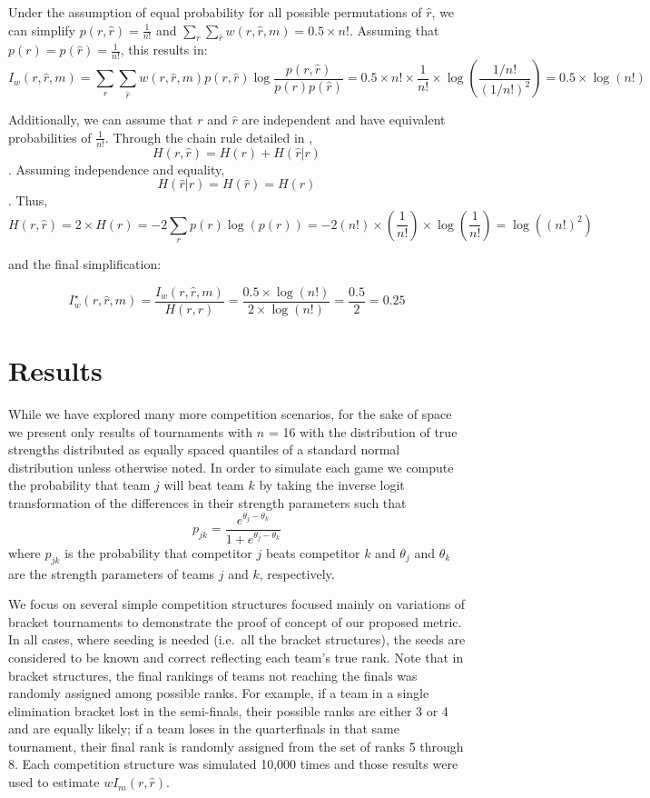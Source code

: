 \documentclass[
  12pt]{article}
\begin{document}
Under the assumption of equal probability for all possible permutations
of \(\hat{r}\), we can simplify \(p(r, \hat{r}) = \frac{1}{n!}\) and
\(\sum_r \sum_{\hat{r}} w(r, \hat{r},m) = 0.5 \times n!\). Assuming that
\(p(r) = p(\hat{r}) = \frac{1}{n!}\), this results in: \[
I_w(r,\hat{r},m) = \sum_{r}\sum_{\hat{r}}w(r, \hat{r}, m)p(r,\hat{r})\log \frac {p(r,\hat{r})}{p(r)p(\hat{r})} = 0.5 \times n! \times \frac{1}{n!} \times \log(\frac{1/n!}{(1/n!)^2}) = 0.5 \times \log(n!)
\]

Additionally, we can assume that \(r\) and \(\hat{r}\) are independent
and have equivalent probabilities of \(\frac{1}{n!}\). Through the chain
rule detailed in \citet{Cover2006}, \[
H(r, \hat{r}) = H(r) + H(\hat{r}|r)
\] . Assuming independence and equality, \[
H(\hat{r}|r) = H(\hat{r}) = H(r)
\] . Thus, \[
H(r,\hat{r}) = 2 \times H(r) = - 2 \sum_{r} p(r)\log(p(r)) = -2(n!) \times (\frac{1}{n!}) \times \log (\frac{1}{n!}) = \log((n!)^2)
\]

and the final simplification:

\[
I^{\star}_w(r,\hat{r},m) = \frac{I_w(r,\hat{r},m)}{H(r, \hat{r})} = \frac{0.5\times \log(n!)}{2\times \log(n!)} = \frac{0.5}{2} = 0.25
\]

\section{Results}\label{results}

While we have explored many more competition scenarios, for the sake of
space we present only results of tournaments with \(n\) = 16 with the
distribution of true strengths distributed as equally spaced quantiles
of a standard normal distribution unless otherwise noted. In order to
simulate each game we compute the probability that team \(j\) will beat
team \(k\) by taking the inverse logit transformation of the differences
in their strength parameters such that\\
\[
p_{jk} = \frac{e^{\theta_j - \theta_k}}{1 + e^{\theta_j - \theta_k}}
\] where \(p_{jk}\) is the probability that competitor \(j\) beats
competitor \(k\) and \(\theta_j\) and \(\theta_k\) are the strength
parameters of teams \(j\) and \(k\), respectively.

We focus on several simple competition structures focused mainly on
variations of bracket tournaments to demonstrate the proof of concept of
our proposed metric. In all cases, where seeding is needed (i.e.~all the
bracket structures), the seeds are considered to be known and correct
reflecting each team's true rank. Note that in bracket structures, the
final rankings of teams not reaching the finals was randomly assigned
among possible ranks. For example, if a team in a single elimination
bracket lost in the semi-finals, their possible ranks are either 3 or 4
and are equally likely; if a team loses in the quarterfinals in that
same tournament, their final rank is randomly assigned from the set of
ranks 5 through 8. Each competition structure was simulated 10,000 times
and those results were used to estimate \(wI_m(r,\hat{r})\).
\end{document}
